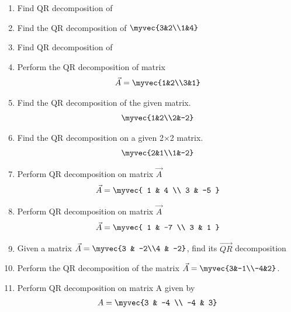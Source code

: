 \begin{enumerate}[label=\thesubsection.\arabic*.,ref=\thesubsection.\theenumi]
\item Find QR decomposition of 
\\
\solution

\item Find the QR decomposition of $\myvec{3&2\\1&4}$ 
\\
\solution

%
\item Find QR decomposition of 
\\
\solution

%
\item Perform the QR decomposition of matrix 
\begin{align}
 \vec{A}=\myvec{1&2\\3&1}
\end{align}
\solution

\item Find the QR decomposition of the given matrix.
\begin{align}
    \myvec{1&2\\2&-2}
\end{align}
\solution

%
\item Find the QR decomposition  on a given 2$\times$2 matrix. 
\begin{align}
    \myvec{2&1\\1&-2}
\end{align}
%
\solution

\item Perform QR decomposition on matrix $\vec{A}$
\begin{align}
    \vec{A}=\myvec{ 1 & 4 \\ 3 & -5 }\label{eq:solutions/2/21/givmat}
\end{align}
\solution

%
\item  Perform QR decomposition on matrix $\vec{A}$
\begin{align}
    \vec{A}=\myvec{ 1 & -7 \\ 3 & 1 }\label{eq:solutions/2/22/givmat}
\end{align}
\solution

%
\item Given a matrix $\vec{A} = \myvec{3 & -2\\4 & -2}$, find its $\vec{QR}$ decomposition
%
\solution

\item Perform the QR decomposition of the matrix $\vec{A}=\myvec{3&-1\\-4&2}$.
\solution

\item Perform QR decomposition on matrix A given by
\begin{align*}
	A = \myvec{3 & -4 \\ -4 & 3} 
\end{align*}


\end{enumerate}
